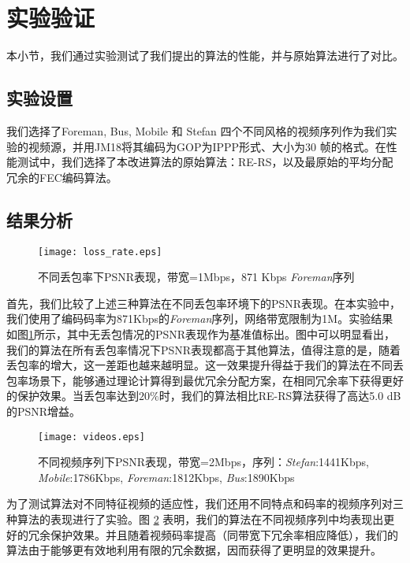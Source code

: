 \section{实验验证}
本小节，我们通过实验测试了我们提出的算法的性能，并与原始算法进行了对比。

    \subsection{实验设置}
    我们选择了Foreman, Bus, Mobile 和 Stefan 四个不同风格的视频序列作为我们实验的视频源，并用JM18\cite{website:jm18}将其编码为GOP为IPPP形式、大小为30 帧的格式。在性能测试中，我们选择了本改进算法的原始算法：RE-RS\cite{xiao2013real}，以及最原始的平均分配冗余的FEC编码算法。


    \subsection{结果分析}

\begin{figure}[htbp]
  \centering
  \texttt{[image: loss\_rate.eps]}\\
  \caption{不同丢包率下PSNR表现，带宽=1Mbps，871 Kbps \emph{Foreman}序列}\label{fig:lossrate}
\end{figure}

首先，我们比较了上述三种算法在不同丢包率环境下的PSNR表现。在本实验中，我们使用了编码码率为871Kbps的\emph{Foreman}序列，网络带宽限制为1M。实验结果如图\ref{fig:lossrate}所示，其中无丢包情况的PSNR表现作为基准值标出。图中可以明显看出，我们的算法在所有丢包率情况下PSNR表现都高于其他算法，值得注意的是，随着丢包率的增大，这一差距也越来越明显。这一效果提升得益于我们的算法在不同丢包率场景下，能够通过理论计算得到最优冗余分配方案，在相同冗余率下获得更好的保护效果。当丢包率达到$20\%$时，我们的算法相比RE-RS算法获得了高达5.0 dB的PSNR增益。

\begin{figure}[htbp]
  \centering
  \texttt{[image: videos.eps]}\\
  \caption{不同视频序列下PSNR表现，带宽=2Mbps，序列：\emph{Stefan}:1441Kbps, \emph{Mobile}:1786Kbps, \emph{Foreman}:1812Kbps, \emph{Bus}:1890Kbps}\label{fig:videos}
\end{figure}

为了测试算法对不同特征视频的适应性，我们还用不同特点和码率的视频序列对三种算法的表现进行了实验。图 \ref{fig:videos} 表明，我们的算法在不同视频序列中均表现出更好的冗余保护效果。并且随着视频码率提高（同带宽下冗余率相应降低），我们的算法由于能够更有效地利用有限的冗余数据，因而获得了更明显的效果提升。

